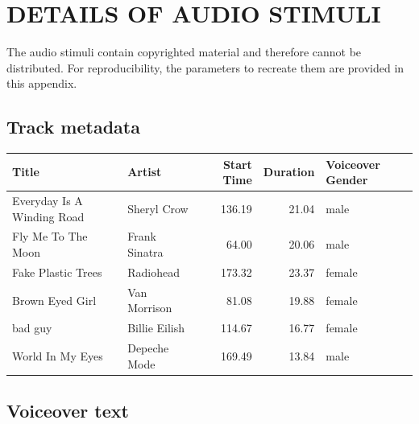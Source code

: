 \documentclass[fleqn]{jaes}
\begin{document}



\clearpage

\appendix
\onecolumn

\section{\MakeUppercase{Details of audio stimuli}}
\label{app:tracks}

The audio stimuli contain copyrighted material and therefore cannot be distributed. For reproducibility, the parameters to recreate them are provided in this appendix.

\subsection*{Track metadata}

\begin{table}[h]
\centering
\begin{tabular}{llrrl}
\toprule
Title & Artist & Start Time & Duration & Voiceover Gender \\
\midrule
Everyday Is A Winding Road & Sheryl Crow & 136.19 & 21.04 & male \\
Fly Me To The Moon & Frank Sinatra & 64.00 & 20.06 & male \\
Fake Plastic Trees & Radiohead & 173.32 & 23.37 & female \\
Brown Eyed Girl & Van Morrison & 81.08 & 19.88 & female \\
bad guy & Billie Eilish & 114.67 & 16.77 & female \\
World In My Eyes & Depeche Mode & 169.49 & 13.84 & male \\
\bottomrule
\end{tabular}
\end{table}


\subsection*{Voiceover text}
\end{document}
